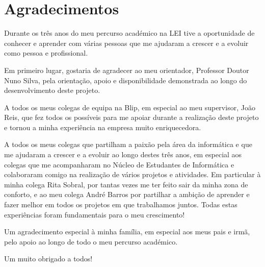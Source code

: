 \titleformat{\chapter}[display]
{\normalfont\bfseries}{}{0pt}{\Huge}

\chapter*{Agradecimentos}

Durante os três anos do meu percurso académico na \ac{LEI} tive a oportunidade de conhecer e
aprender com várias pessoas que me ajudaram a crescer e a evoluir como pessoa e profissional.

Em primeiro lugar, gostaria de agradecer ao meu orientador, Professor Doutor Nuno Silva, pela
orientação, apoio e disponibilidade demonstrada ao longo do desenvolvimento deste projeto. 

A todos os meus colegas de equipa na Blip, em especial ao meu supervisor, João Reis, que fez todos
os possíveis para me apoiar durante a realização deste projeto e tornou a minha experiência na
empresa muito enriquecedora.

A todos os meus colegas que partilham a paixão pela área da informática e que me ajudaram a crescer
e a evoluir ao longo destes três anos, em especial aos colegas que me acompanharam no Núcleo de 
Estudantes de Informática e colaboraram comigo na realização de vários projetos e atividades. Em
particular à minha colega Rita Sobral, por tantas vezes me ter feito sair da minha zona de conforto, 
e ao meu colega André Barros por partilhar a ambição de aprender e fazer melhor em todos os projetos 
em que trabalhamos juntos. Todas estas experiências foram fundamentais para o meu crescimento!

Um agradecimento especial à minha família, em especial aos meus pais e irmã, pelo apoio ao longo 
de todo o meu percurso académico.

Um muito obrigado a todos!

